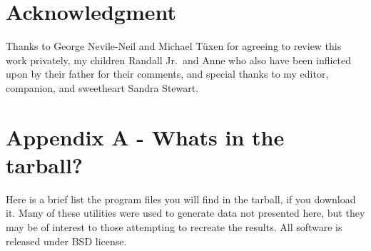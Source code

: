 \documentclass[12pt]{article}
\begin{document}
\section*{Acknowledgment}

Thanks to George Nevile-Neil and Michael T\"uxen for agreeing to review this work privately, my children Randall Jr.~and Anne who also have been inflicted upon by their father for their comments, and special thanks to my editor,
companion, and sweetheart Sandra Stewart.

\section*{Appendix A - Whats in the tarball?}
Here is a brief list the program files you will find in the tarball, if you download it. Many of
these utilities were used to generate data not presented here, but they may be of interest
to those attempting to recreate the results. All software is released under BSD license.
\end{document}
